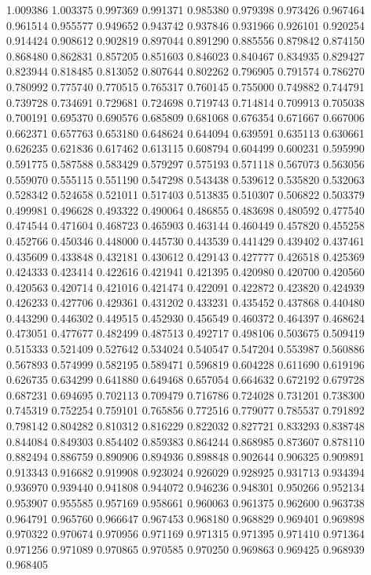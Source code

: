 1.009386
1.003375
0.997369
0.991371
0.985380
0.979398
0.973426
0.967464
0.961514
0.955577
0.949652
0.943742
0.937846
0.931966
0.926101
0.920254
0.914424
0.908612
0.902819
0.897044
0.891290
0.885556
0.879842
0.874150
0.868480
0.862831
0.857205
0.851603
0.846023
0.840467
0.834935
0.829427
0.823944
0.818485
0.813052
0.807644
0.802262
0.796905
0.791574
0.786270
0.780992
0.775740
0.770515
0.765317
0.760145
0.755000
0.749882
0.744791
0.739728
0.734691
0.729681
0.724698
0.719743
0.714814
0.709913
0.705038
0.700191
0.695370
0.690576
0.685809
0.681068
0.676354
0.671667
0.667006
0.662371
0.657763
0.653180
0.648624
0.644094
0.639591
0.635113
0.630661
0.626235
0.621836
0.617462
0.613115
0.608794
0.604499
0.600231
0.595990
0.591775
0.587588
0.583429
0.579297
0.575193
0.571118
0.567073
0.563056
0.559070
0.555115
0.551190
0.547298
0.543438
0.539612
0.535820
0.532063
0.528342
0.524658
0.521011
0.517403
0.513835
0.510307
0.506822
0.503379
0.499981
0.496628
0.493322
0.490064
0.486855
0.483698
0.480592
0.477540
0.474544
0.471604
0.468723
0.465903
0.463144
0.460449
0.457820
0.455258
0.452766
0.450346
0.448000
0.445730
0.443539
0.441429
0.439402
0.437461
0.435609
0.433848
0.432181
0.430612
0.429143
0.427777
0.426518
0.425369
0.424333
0.423414
0.422616
0.421941
0.421395
0.420980
0.420700
0.420560
0.420563
0.420714
0.421016
0.421474
0.422091
0.422872
0.423820
0.424939
0.426233
0.427706
0.429361
0.431202
0.433231
0.435452
0.437868
0.440480
0.443290
0.446302
0.449515
0.452930
0.456549
0.460372
0.464397
0.468624
0.473051
0.477677
0.482499
0.487513
0.492717
0.498106
0.503675
0.509419
0.515333
0.521409
0.527642
0.534024
0.540547
0.547204
0.553987
0.560886
0.567893
0.574999
0.582195
0.589471
0.596819
0.604228
0.611690
0.619196
0.626735
0.634299
0.641880
0.649468
0.657054
0.664632
0.672192
0.679728
0.687231
0.694695
0.702113
0.709479
0.716786
0.724028
0.731201
0.738300
0.745319
0.752254
0.759101
0.765856
0.772516
0.779077
0.785537
0.791892
0.798142
0.804282
0.810312
0.816229
0.822032
0.827721
0.833293
0.838748
0.844084
0.849303
0.854402
0.859383
0.864244
0.868985
0.873607
0.878110
0.882494
0.886759
0.890906
0.894936
0.898848
0.902644
0.906325
0.909891
0.913343
0.916682
0.919908
0.923024
0.926029
0.928925
0.931713
0.934394
0.936970
0.939440
0.941808
0.944072
0.946236
0.948301
0.950266
0.952134
0.953907
0.955585
0.957169
0.958661
0.960063
0.961375
0.962600
0.963738
0.964791
0.965760
0.966647
0.967453
0.968180
0.968829
0.969401
0.969898
0.970322
0.970674
0.970956
0.971169
0.971315
0.971395
0.971410
0.971364
0.971256
0.971089
0.970865
0.970585
0.970250
0.969863
0.969425
0.968939
0.968405
